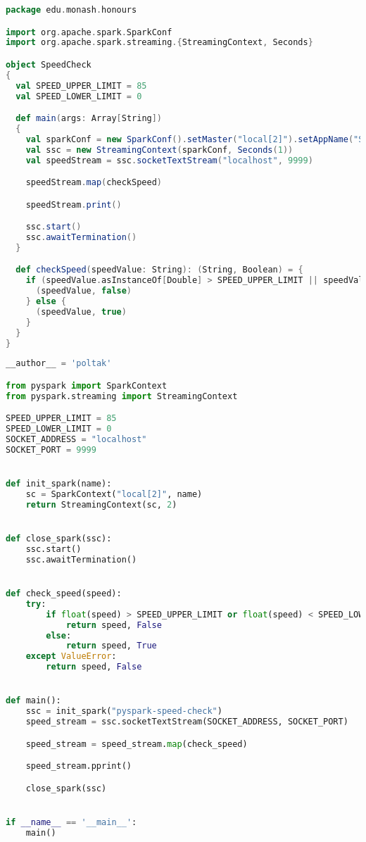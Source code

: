 \begin{lstlisting}[language=scala,caption=edu.monash.honours.SpeedCheck (Scala),label=spark-scala]
package edu.monash.honours

import org.apache.spark.SparkConf
import org.apache.spark.streaming.{StreamingContext, Seconds}

object SpeedCheck
{
  val SPEED_UPPER_LIMIT = 85
  val SPEED_LOWER_LIMIT = 0

  def main(args: Array[String])
  {
    val sparkConf = new SparkConf().setMaster("local[2]").setAppName("SpeedCheck")
    val ssc = new StreamingContext(sparkConf, Seconds(1))
    val speedStream = ssc.socketTextStream("localhost", 9999)

    speedStream.map(checkSpeed)

    speedStream.print()

    ssc.start()
    ssc.awaitTermination()
  }

  def checkSpeed(speedValue: String): (String, Boolean) = {
    if (speedValue.asInstanceOf[Double] > SPEED_UPPER_LIMIT || speedValue.asInstanceOf[Double] < SPEED_LOWER_LIMIT) {
      (speedValue, false)
    } else {
      (speedValue, true)
    }
  }
}
\end{lstlisting}
\clearpage

\begin{lstlisting}[language=python,caption=edu.monash.honours.SpeedCheck (Python),label=spark-python]
__author__ = 'poltak'

from pyspark import SparkContext
from pyspark.streaming import StreamingContext

SPEED_UPPER_LIMIT = 85
SPEED_LOWER_LIMIT = 0
SOCKET_ADDRESS = "localhost"
SOCKET_PORT = 9999


def init_spark(name):
    sc = SparkContext("local[2]", name)
    return StreamingContext(sc, 2)


def close_spark(ssc):
    ssc.start()
    ssc.awaitTermination()


def check_speed(speed):
    try:
        if float(speed) > SPEED_UPPER_LIMIT or float(speed) < SPEED_LOWER_LIMIT:
            return speed, False
        else:
            return speed, True
    except ValueError:
        return speed, False


def main():
    ssc = init_spark("pyspark-speed-check")
    speed_stream = ssc.socketTextStream(SOCKET_ADDRESS, SOCKET_PORT)

    speed_stream = speed_stream.map(check_speed)

    speed_stream.pprint()

    close_spark(ssc)


if __name__ == '__main__':
    main()
\end{lstlisting}
